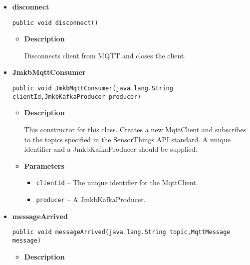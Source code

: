 {{{{{\begin{itemize}
{\begin{itemize}
{Called when delivery for a message has been completed, and all acknowledgments have been received. In this implementation of this method, nothing happens.
}
\item{
{\bf  Parameters}
  \begin{itemize}
   \item{
\texttt{token} -- the delivery token associated with the message.}
  \end{itemize}
}%
\end{itemize}
}%
\item{ 
\hypertarget{Bridge.JmkbMqttConsumer.disconnect()}{{\bf  disconnect}\\}
\begin{lstlisting}[frame=none]
public void disconnect()\end{lstlisting} %
\begin{itemize}
\item{
{\bf  Description}

Disconnects client from MQTT and closes the client.
}
\end{itemize}
}%
\item{ 
\hypertarget{Bridge.JmkbMqttConsumer.JmkbMqttConsumer(java.lang.String, Bridge.JmkbKafkaProducer)}{{\bf  JmkbMqttConsumer}\\}
\begin{lstlisting}[frame=none]
public void JmkbMqttConsumer(java.lang.String clientId,JmkbKafkaProducer producer)\end{lstlisting} %
\begin{itemize}
\item{
{\bf  Description}

This constructor for this class. Creates a new MqttClient and subscribes to the topics specified in the SensorThings API standard. A unique identifier and a JmkbKafkaProducer should be supplied.
}
\item{
{\bf  Parameters}
  \begin{itemize}
   \item{
\texttt{clientId} -- The unique identifier for the MqttClient.}
   \item{
\texttt{producer} -- A JmkbKafkaProducer.}
  \end{itemize}
}%
\end{itemize}
}%
\item{ 
\hypertarget{Bridge.JmkbMqttConsumer.messageArrived(java.lang.String, MqttMessage)}{{\bf  messageArrived}\\}
\begin{lstlisting}[frame=none]
public void messageArrived(java.lang.String topic,MqttMessage message)\end{lstlisting} %
\begin{itemize}
\item{
{\bf  Description}

}
\end{itemize}}
\end{itemize}}}}}}
